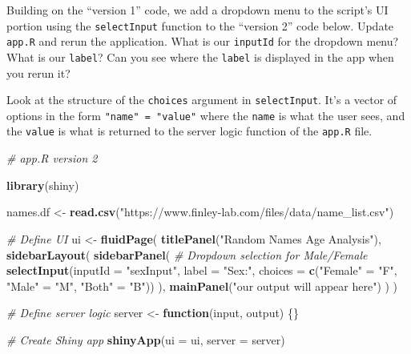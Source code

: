 \documentclass[
]{krantz}
\makeatletter
\newenvironment{Shaded}{\begin{snugshade}}{\end{snugshade}}
\newcommand{\CommentTok}[1]{\textcolor[rgb]{0.37,0.37,0.37}{\textit{#1}}}
\newcommand{\ControlFlowTok}[1]{\textcolor[rgb]{0.27,0.27,0.27}{\textbf{#1}}}
\newcommand{\DataTypeTok}[1]{\textcolor[rgb]{0.27,0.27,0.27}{#1}}
\newcommand{\KeywordTok}[1]{\textcolor[rgb]{0.27,0.27,0.27}{\textbf{#1}}}
\newcommand{\NormalTok}[1]{#1}
\newcommand{\StringTok}[1]{\textcolor[rgb]{0.5,0.5,0.5}{#1}}
\newenvironment{kframe}{%
\medskip{}
\setlength{\fboxsep}{.8em}
 \def\at@end@of@kframe{}%
 \ifinner\ifhmode%
  \def\at@end@of@kframe{\end{minipage}}%
  \begin{minipage}{\columnwidth}%
 \fi\fi%
 \def\FrameCommand##1{\hskip\@totalleftmargin \hskip-\fboxsep
 \colorbox{shadecolor}{##1}\hskip-\fboxsep
     \hskip-\linewidth \hskip-\@totalleftmargin \hskip\columnwidth}%
 \MakeFramed {\advance\hsize-\width
   \@totalleftmargin\z@ \linewidth\hsize
   \@setminipage}}%
 {\par\unskip\endMakeFramed%
 \at@end@of@kframe}
\renewenvironment{Shaded}{\begin{kframe}}{\end{kframe}}
\makeatother
\begin{document}
Building on the ``version 1'' code, we add a dropdown menu to the script's UI portion using the \texttt{selectInput} function to the ``version 2'' code below. Update \texttt{app.R} and rerun the application. What is our \texttt{inputId} for the dropdown menu? What is our \texttt{label}? Can you see where the \texttt{label} is displayed in the app when you rerun it?

Look at the structure of the \texttt{choices} argument in \texttt{selectInput}. It's a vector of options in the form \texttt{"name"\ =\ "value"} where the \texttt{name} is what the user sees, and the \texttt{value} is what is returned to the server logic function of the \texttt{app.R} file.

\begin{Shaded}
\begin{Highlighting}[]
\CommentTok{\# app.R version 2}

\KeywordTok{library}\NormalTok{(shiny)}

\NormalTok{names.df \textless{}{-}}\StringTok{ }\KeywordTok{read.csv}\NormalTok{(}\StringTok{"https://www.finley{-}lab.com/files/data/name\_list.csv"}\NormalTok{)}

\CommentTok{\# Define UI}
\NormalTok{ui \textless{}{-}}\StringTok{ }\KeywordTok{fluidPage}\NormalTok{(}
  \KeywordTok{titlePanel}\NormalTok{(}\StringTok{"Random Names Age Analysis"}\NormalTok{),}
  \KeywordTok{sidebarLayout}\NormalTok{(}
    \KeywordTok{sidebarPanel}\NormalTok{(}
      \CommentTok{\# Dropdown selection for Male/Female}
      \KeywordTok{selectInput}\NormalTok{(}\DataTypeTok{inputId =} \StringTok{"sexInput"}\NormalTok{, }\DataTypeTok{label =} \StringTok{"Sex:"}\NormalTok{,}
                  \DataTypeTok{choices =} \KeywordTok{c}\NormalTok{(}\StringTok{"Female"}\NormalTok{ =}\StringTok{ "F"}\NormalTok{, }
                              \StringTok{"Male"}\NormalTok{ =}\StringTok{ "M"}\NormalTok{, }
                              \StringTok{"Both"}\NormalTok{ =}\StringTok{ "B"}\NormalTok{))}
\NormalTok{    ),}
    \KeywordTok{mainPanel}\NormalTok{(}\StringTok{"our output will appear here"}\NormalTok{)}
\NormalTok{  )}
\NormalTok{)}

\CommentTok{\# Define server logic}
\NormalTok{server \textless{}{-}}\StringTok{ }\ControlFlowTok{function}\NormalTok{(input, output) \{\}}

\CommentTok{\# Create Shiny app}
\KeywordTok{shinyApp}\NormalTok{(}\DataTypeTok{ui =}\NormalTok{ ui, }\DataTypeTok{server =}\NormalTok{ server)}
\end{Highlighting}
\end{Shaded}
\end{document}
